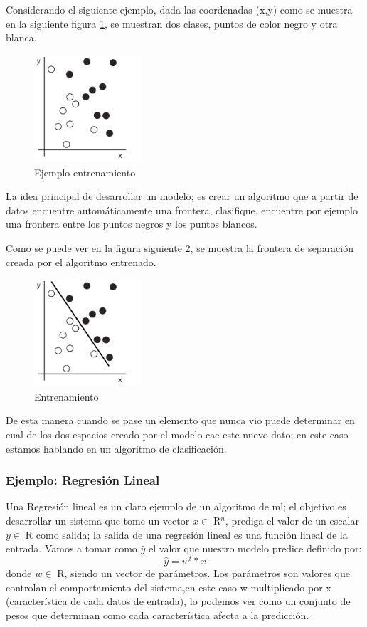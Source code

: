 Considerando el siguiente ejemplo, dada las coordenadas (x,y) como se muestra en la siguiente figura \ref{Fig:ejemplo-1}, se muestran dos clases, puntos de color negro y otra blanca.
\begin{figure}[H] \centering
  \includegraphics[height=4cm,keepaspectratio=true,clip=true]{imagenes/MarcoTeorico/sample.png}
  \caption{Ejemplo entrenamiento}\label{Fig:ejemplo-1}
\end{figure}

La idea principal de desarrollar un modelo; es crear un algoritmo que a partir de datos encuentre automáticamente una frontera, clasifique, encuentre por ejemplo una frontera entre los puntos negros y los puntos blancos.

Como se puede ver en la figura siguiente \ref{Fig:ejemplo-2}, se muestra la frontera de separación creada por el algoritmo entrenado.
\begin{figure}[H] \centering
  \includegraphics[height=4cm,keepaspectratio=true,clip=true]{imagenes/MarcoTeorico/sample-fit-1.png}
  \caption{Entrenamiento}\label{Fig:ejemplo-2}
\end{figure}

De esta manera cuando se pase un elemento que nunca vio puede determinar en cual de los dos espacios creado por el modelo cae este nuevo dato; en este caso estamos hablando en un algoritmo de clasificación.

\subsubsection*{Ejemplo: Regresión Lineal}
Una Regresión lineal es un claro ejemplo de un algoritmo de \ac{ml}; el objetivo es desarrollar un sistema que tome un vector $x \in \; $R$^n$, prediga el valor de un escalar $y \in \; $R$ $ como salida; la salida de una regresión lineal es una función lineal de la entrada.  Vamos a tomar como $\hat{y}$ el valor que nuestro modelo predice definido por:
\begin{equation}
\hat{y} = w^t * x
\end{equation}
donde $w \in \; $R$ $, siendo un vector de parámetros.
Los parámetros son valores que controlan el comportamiento del sistema,en este caso w  multiplicado por x (característica de cada datos de entrada), lo podemos ver como un conjunto de pesos que determinan como cada característica afecta a la predicción.

